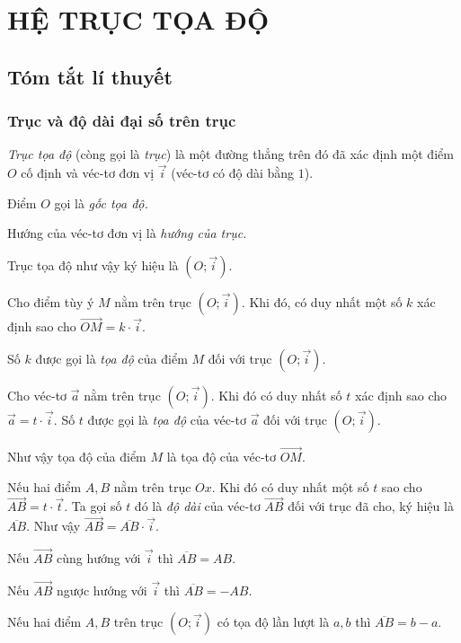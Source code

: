\section{HỆ TRỤC TỌA ĐỘ}
\subsection{Tóm tắt lí thuyết}
\subsubsection*{Trục và độ dài đại số trên trục}
\textit{Trục tọa độ} (còng gọi là \textit{trục}) là một đường thẳng trên đó đã xác định một điểm $O$ cố định và véc-tơ đơn vị $\overrightarrow{i}$ (véc-tơ có độ dài bằng $1$).

Điểm $O$ gọi là \textit{gốc tọa độ.}

Hướng của véc-tơ đơn vị là \textit{hướng của trục.}

Trục tọa độ như vậy ký hiệu là $(O; \overrightarrow{i}).$

Cho điểm tùy ý $M$ nằm trên trục $(O; \overrightarrow{i}).$ Khi đó, có duy nhất một số $k$ xác định sao cho $\overrightarrow{OM}= k \cdot \overrightarrow{i}.$

Số $k$ được gọi là \textit{tọa độ} của điểm $M$ đối với trục $(O;\overrightarrow{i}).$

Cho véc-tơ $\overrightarrow{a}$ nằm trên trục $(O;\overrightarrow{i}).$ Khi đó có duy nhất số $t$ xác định sao cho $\overrightarrow{a} = t \cdot \overrightarrow{i}.$ Số $t$ được gọi là \textit{tọa độ} của véc-tơ $\overrightarrow{a}$ đối với trục $(O;\overrightarrow{i}).$

Như vậy tọa độ của điểm $M$ là tọa độ của véc-tơ $\overrightarrow{OM}.$

Nếu hai điểm $A,B$ nằm trên trục $Ox.$ Khi đó có duy nhất một số $t$ sao cho $\overrightarrow{AB}=t \cdot \overrightarrow{t}.$ Ta gọi số $t$ đó là \textit{độ dài} của véc-tơ $\overrightarrow{AB}$ đối với trục đã cho, ký hiệu là $\overline{AB}.$ Như vậy $\overrightarrow{AB}= \overline{AB}\cdot \overrightarrow{i}.$ 

\begin{note}
Nếu $\overrightarrow{AB}$ cùng hướng với $\overrightarrow{i}$ thì $\overline{AB}=AB.$

Nếu $\overrightarrow{AB}$ ngược hướng với $\overrightarrow{i}$ thì $\overline{AB}=-AB.$

Nếu hai điểm $A,B$ trên trục $(O;\overrightarrow{i})$ có tọa độ lần lượt là $a,b$ thì $\overline{AB}=b-a.$
\end{note}

